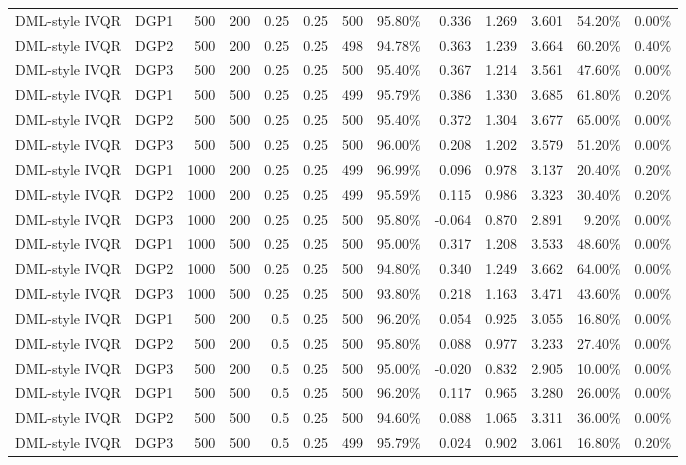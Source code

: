 \begin{landscape}
\begin{longtable}{llrrrrrrrrrrr}
DML-style IVQR & DGP1 & 500 & 200 & 0.25 & 0.25 & 500 & 95.80\% & 0.336 & 1.269 & 3.601 & 54.20\% & 0.00\% \\
DML-style IVQR & DGP2 & 500 & 200 & 0.25 & 0.25 & 498 & 94.78\% & 0.363 & 1.239 & 3.664 & 60.20\% & 0.40\% \\
DML-style IVQR & DGP3 & 500 & 200 & 0.25 & 0.25 & 500 & 95.40\% & 0.367 & 1.214 & 3.561 & 47.60\% & 0.00\% \\
DML-style IVQR & DGP1 & 500 & 500 & 0.25 & 0.25 & 499 & 95.79\% & 0.386 & 1.330 & 3.685 & 61.80\% & 0.20\% \\
DML-style IVQR & DGP2 & 500 & 500 & 0.25 & 0.25 & 500 & 95.40\% & 0.372 & 1.304 & 3.677 & 65.00\% & 0.00\% \\
DML-style IVQR & DGP3 & 500 & 500 & 0.25 & 0.25 & 500 & 96.00\% & 0.208 & 1.202 & 3.579 & 51.20\% & 0.00\% \\
DML-style IVQR & DGP1 & 1000 & 200 & 0.25 & 0.25 & 499 & 96.99\% & 0.096 & 0.978 & 3.137 & 20.40\% & 0.20\% \\
DML-style IVQR & DGP2 & 1000 & 200 & 0.25 & 0.25 & 499 & 95.59\% & 0.115 & 0.986 & 3.323 & 30.40\% & 0.20\% \\
DML-style IVQR & DGP3 & 1000 & 200 & 0.25 & 0.25 & 500 & 95.80\% & -0.064 & 0.870 & 2.891 & 9.20\% & 0.00\% \\
DML-style IVQR & DGP1 & 1000 & 500 & 0.25 & 0.25 & 500 & 95.00\% & 0.317 & 1.208 & 3.533 & 48.60\% & 0.00\% \\
DML-style IVQR & DGP2 & 1000 & 500 & 0.25 & 0.25 & 500 & 94.80\% & 0.340 & 1.249 & 3.662 & 64.00\% & 0.00\% \\
DML-style IVQR & DGP3 & 1000 & 500 & 0.25 & 0.25 & 500 & 93.80\% & 0.218 & 1.163 & 3.471 & 43.60\% & 0.00\% \\
DML-style IVQR & DGP1 & 500 & 200 & 0.5 & 0.25 & 500 & 96.20\% & 0.054 & 0.925 & 3.055 & 16.80\% & 0.00\% \\
DML-style IVQR & DGP2 & 500 & 200 & 0.5 & 0.25 & 500 & 95.80\% & 0.088 & 0.977 & 3.233 & 27.40\% & 0.00\% \\
DML-style IVQR & DGP3 & 500 & 200 & 0.5 & 0.25 & 500 & 95.00\% & -0.020 & 0.832 & 2.905 & 10.00\% & 0.00\% \\
DML-style IVQR & DGP1 & 500 & 500 & 0.5 & 0.25 & 500 & 96.20\% & 0.117 & 0.965 & 3.280 & 26.00\% & 0.00\% \\
DML-style IVQR & DGP2 & 500 & 500 & 0.5 & 0.25 & 500 & 94.60\% & 0.088 & 1.065 & 3.311 & 36.00\% & 0.00\% \\
DML-style IVQR & DGP3 & 500 & 500 & 0.5 & 0.25 & 499 & 95.79\% & 0.024 & 0.902 & 3.061 & 16.80\% & 0.20\% \\

\end{longtable}
\end{landscape}
